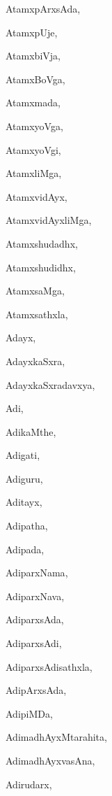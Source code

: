 \begin{multicols}{2}
{AtamxpArxsAda}, \pageref{AtamxpArxsAda}

{AtamxpUje}, \pageref{AtamxpUje}

{AtamxbiVja}, \pageref{AtamxbiVja}

{AtamxBoVga}, \pageref{AtamxBoVga}

{Atamxmada}, \pageref{Atamxmada}

{AtamxyoVga}, \pageref{AtamxyoVga}

{AtamxyoVgi}, \pageref{AtamxyoVgi}

{AtamxliMga}, \pageref{AtamxliMga}

{AtamxvidAyx}, \pageref{AtamxvidAyx}

{AtamxvidAyxliMga}, \pageref{AtamxvidAyxliMga}

{Atamxshudadhx}, \pageref{Atamxshudadhx}

{Atamxshudidhx}, \pageref{Atamxshudidhx}

{AtamxsaMga}, \pageref{AtamxsaMga}

{Atamxsathxla}, \pageref{Atamxsathxla}

{Adayx}, \pageref{Adayx}

{AdayxkaSxra}, \pageref{AdayxkaSxra}

{AdayxkaSxradavxya}, \pageref{AdayxkaSxradavxya}

{Adi}, \pageref{Adi}

{AdikaMthe}, \pageref{AdikaMthe}

{Adigati}, \pageref{Adigati}

{Adiguru}, \pageref{Adiguru}

{Aditayx}, \pageref{Aditayx}

{Adipatha}, \pageref{Adipatha}

{Adipada}, \pageref{Adipada}

{AdiparxNama}, \pageref{AdiparxNama}

{AdiparxNava}, \pageref{AdiparxNava}

{AdiparxsAda}, \pageref{AdiparxsAda}

{AdiparxsAdi}, \pageref{AdiparxsAdi}

{AdiparxsAdisathxla}, \pageref{AdiparxsAdisathxla}

{AdipArxsAda}, \pageref{AdipArxsAda}

{AdipiMDa}, \pageref{AdipiMDa}

{AdimadhAyxMtarahita}, \pageref{AdimadhAyxMtarahita}

{AdimadhAyxvasAna}, \pageref{AdimadhAyxvasAna}

{Adirudarx}, \pageref{Adirudarx}


\end{multicols}
